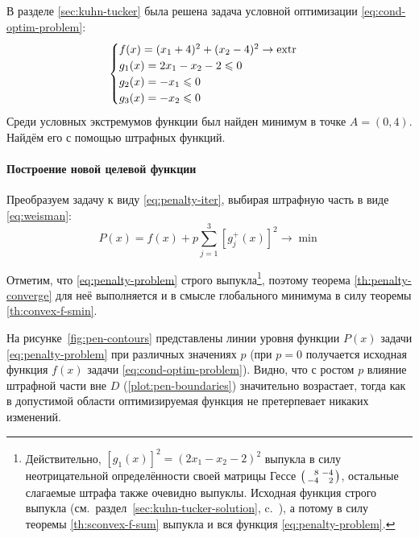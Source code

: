 В разделе \ref{sec:kuhn-tucker} была решена задача условной
оптимизации \eqref{eq:cond-optim-problem}:
\begin{equation*}
  \begin{cases}
    f(x) = (x_1+4)^2 + (x_2-4)^2 \to \operatorname{extr} \\
    g_1(x) = 2x_1 - x_2 - 2 \leqslant 0 \\
    g_2(x) = -x_1 \leqslant 0 \\
    g_3(x) = -x_2 \leqslant 0
  \end{cases}
\end{equation*}
Среди условных экстремумов функции был найден минимум в точке \mbox{$A
  = (0, 4)$}. Найдём его с помощью штрафных функций.

\paragraph{Построение новой целевой функции}

Преобразуем задачу к виду \eqref{eq:penalty-iter}, выбирая штрафную
часть в виде \eqref{eq:weisman}:
\begin{equation}
  \label{eq:penalty-problem}
  P(x) = f(x) + p \sum_{j=1}^3{ \left [ g_j^+(x) \right ]^2} \to \min
\end{equation}

Отметим, что \eqref{eq:penalty-problem} строго
выпукла\footnote{Действительно, $\left[g_1(x)\right]^2=(2x_1-x_2-2)^2$
  выпукла в силу неотрицательной определённости своей матрицы Гессе
  $\left(\begin{smallmatrix}\phm{}8&-4\\-4&\phm{}2 \end{smallmatrix}\right)$,
  остальные слагаемые штрафа также очевидно выпуклы. Исходная функция
  строго выпукла (см. раздел \ref{sec:kuhn-tucker-solution},
  c. \pageref{eq:cond-optim-hess}), а потому в силу теоремы
  \ref{th:sconvex-f-sum} выпукла и вся функция
  \eqref{eq:penalty-problem}.}, поэтому теорема
\ref{th:penalty-converge} для неё выполняется и в смысле глобального
минимума в силу теоремы \ref{th:convex-f-smin}.

На рисунке \ref{fig:pen-contours} представлены линии уровня функции
$P(x)$ задачи \eqref{eq:penalty-problem} при различных значениях $p$
(при $p=0$ получается исходная функция $f(x)$ задачи
\eqref{eq:cond-optim-problem}). Видно, что с ростом $p$ влияние
штрафной части вне $D$ (\ref{plot:pen-boundaries}) значительно
возрастает, тогда как в допустимой области оптимизируемая функция не
претерпевает никаких изменений.

